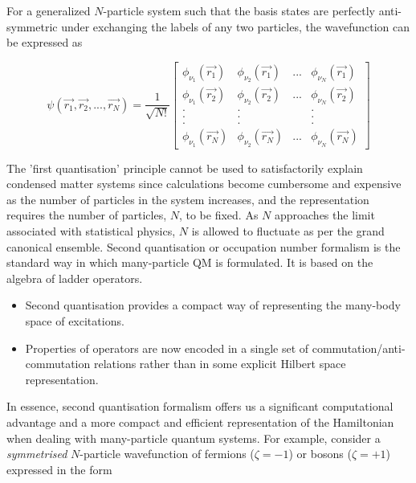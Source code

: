 For a generalized $N$-particle system such that the basis states are perfectly anti-symmetric under exchanging the labels of any two particles, the wavefunction can be expressed as

\begin{equation*}
    \psi(\vec{r_{1}}, \vec{r_{2}},..., \vec{r_{N}}) = \frac{1}{\sqrt{N!}} \begin{bmatrix}
        \phi_{\nu_{1}}(\vec{r_{1}}) & \phi_{\nu_{2}}(\vec{r_{1}}) & ... & \phi_{\nu_{N}}(\vec{r_{1}}) \\
        \phi_{\nu_{1}}(\vec{r_{2}}) & \phi_{\nu_{2}}(\vec{r_{2}}) & ... & \phi_{\nu_{N}}(\vec{r_{2}}) \\
        . & . &  & . \\
        . & . &  & . \\
        . & . &  & . \\
        \phi_{\nu_{1}}(\vec{r_{N}}) & \phi_{\nu_{2}}(\vec{r_{N}}) & ... & \phi_{\nu_{N}}(\vec{r_{N}})
    \end{bmatrix}
\end{equation*}

The 'first quantisation' principle cannot be used to satisfactorily explain condensed matter systems since calculations become cumbersome and expensive as the number of particles in the system increases, and the representation requires the number of particles, $N$, to be fixed. As $N$ approaches the limit associated with statistical physics, $N$ is allowed to fluctuate as per the grand canonical ensemble. Second quantisation or occupation number formalism is the standard way in which many-particle QM is formulated. It is based on the algebra of ladder operators.

\begin{itemize}
    \item Second quantisation provides a compact way of representing the many-body space of excitations.
    \item Properties of operators are now encoded in a single set of commutation/anti-commutation relations rather than in some explicit Hilbert space representation. 
\end{itemize}

In essence, second quantisation formalism offers us a significant computational advantage and a more compact and efficient representation of the Hamiltonian when dealing with many-particle quantum systems. For example, consider a \textit{symmetrised} $N$-particle wavefunction of fermions ($\zeta = -1$) or bosons ($\zeta = +1$) expressed in the form 

